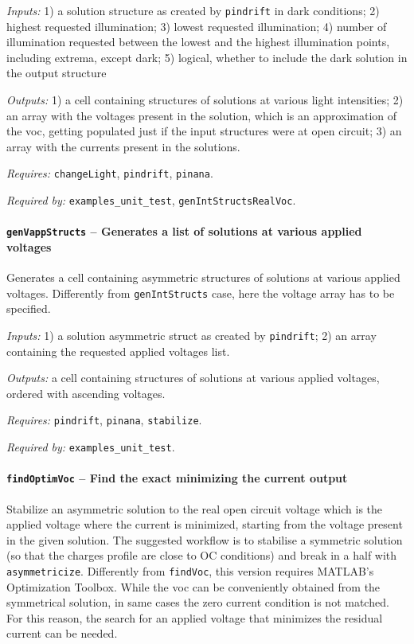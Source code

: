 		\textit{Inputs:} 1) a solution structure as created by \texttt{pin\-drift} in dark conditions;
		2) highest requested illumination;
		3) lowest requested illumination;
		4) number of illumination requested between the lowest and the highest illumination points, including extrema, except dark;
		5) logical, whether to include the dark solution in the output structure

		\textit{Outputs:} 1) a cell containing structures of solutions at various light
		intensities;
		2) an array with the voltages present in the solution, which is
		an approximation of the \gls{voc}, getting populated just if the input
		structures were at open circuit;
		3) an array with the currents present in the solutions.

		\textit{Requires:} \texttt{change\-Light}, \texttt{pin\-drift}, \texttt{pinana}.

		\textit{Required by:} \texttt{examples\_unit\_test}, \texttt{gen\-Int\-Structs\-Real\-Voc}.

		\paragraph{\texttt{gen\-Vapp\-Structs} -- Generates a list of solutions at various applied voltages}\label{genVappStructs}
		Generates a cell containing asymmetric structures of solutions at various applied voltages.
		Differently from \texttt{gen\-Int\-Structs} case, here the voltage array has to be specified.

		\textit{Inputs:} 1) a solution asymmetric struct as created by \texttt{pin\-drift};
		2) an array containing the requested applied voltages list.

		\textit{Outputs:} a cell containing structures of solutions at various applied
		voltages, ordered with ascending voltages.

		\textit{Requires:} \texttt{pin\-drift}, \texttt{pinana}, \texttt{stabilize}.

		\textit{Required by:} \texttt{examples\_unit\_test}.

		\paragraph{\texttt{find\-Optim\-Voc} -- Find the exact  minimizing the current output}
		Stabilize an asymmetric solution to the real open circuit voltage
		which is the applied voltage where the current is minimized,
		starting from the voltage present in the given solution. The suggested
		workflow is to stabilise a symmetric solution (so that the charges
		profile are close to OC conditions) and break in a half with
		\texttt{asymmetricize}.
		Differently from \texttt{find\-Voc}, this version requires MATLAB's Optimization Toolbox.
		While the \gls{voc} can be conveniently obtained from the symmetrical solution, in same cases the zero current condition is not matched.
		For this reason, the search for an applied voltage that minimizes the residual current can be needed.

